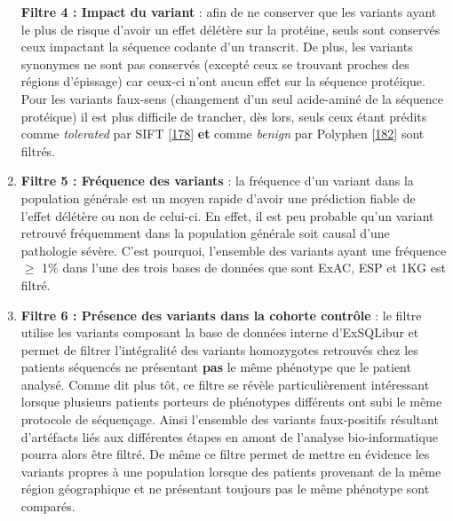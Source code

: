 \documentclass[12pt,a4paper,twoside]{ugathesis}
\theoremstyle{definition}
\theoremstyle{definition}
\theoremstyle{definition}
\theoremstyle{remark}
\begin{document}
\begin{enumerate}
  \textbf{Filtre 4 : Impact du variant} : afin de ne conserver que les
  variants ayant le plus de risque d'avoir un effet délétère sur la
  protéine, seuls sont conservés ceux impactant la séquence codante d'un
  transcrit. De plus, les variants synonymes ne sont pas conservés
  (excepté ceux se trouvant proches des régions d'épissage) car ceux-ci
  n'ont aucun effet sur la séquence protéique. Pour les variants
  faux-sens (changement d'un seul acide-aminé de la séquence protéique)
  il est plus difficile de trancher, dès lors, seuls ceux étant prédits
  comme \emph{tolerated} par SIFT
  {[}\protect\hyperlink{ref-Kumar2009}{178}{]} \textbf{et} comme
  \emph{benign} par Polyphen
  {[}\protect\hyperlink{ref-Adzhubei2010}{182}{]} sont filtrés.
\item
  \textbf{Filtre 5 : Fréquence des variants} : la fréquence d'un variant
  dans la population générale est un moyen rapide d'avoir une prédiction
  fiable de l'effet délétère ou non de celui-ci. En effet, il est peu
  probable qu'un variant retrouvé fréquemment dans la population
  générale soit causal d'une pathologie sévère. C'est pourquoi,
  l'ensemble des variants ayant une fréquence \(\ge\) 1\% dans l'une des
  trois bases de données que sont ExAC, ESP et 1KG est filtré.
\item
  \textbf{Filtre 6 : Présence des variants dans la cohorte contrôle} :
  le filtre utilise les variants composant la base de données interne
  d'ExSQLibur et permet de filtrer l'intégralité des variants
  homozygotes retrouvés chez les patients séquencés ne présentant
  \textbf{pas} le même phénotype que le patient analysé. Comme dit plus
  tôt, ce filtre se révèle particulièrement intéressant lorsque
  plusieurs patients porteurs de phénotypes différents ont subi le même
  protocole de séquençage. Ainsi l'ensemble des variants faux-positifs
  résultant d'artéfacts liés aux différentes étapes en amont de
  l'analyse bio-informatique pourra alors être filtré. De même ce filtre
  permet de mettre en évidence les variants propres à une population
  lorsque des patients provenant de la même région géographique et ne
  présentant toujours pas le même phénotype sont comparés.
\end{enumerate}
\end{document}
